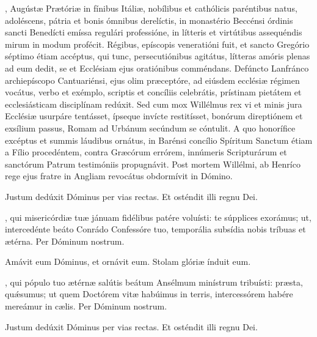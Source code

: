 \documentclass[fontsize=9pt,paper=A6,twoside,BCOR=1mm,DIV=22,headinclude]{scrarticle}
\begin{document}
\begin{multicols}{2}
{\columnbreak
{}
, Augústæ Prætóriæ in fínibus Itáliæ, nobílibus et cathólicis paréntibus natus, adoléscens, pátria et bonis ómnibus derelíctis, in monastério Beccénsi órdinis sancti Benedícti emíssa regulári professióne, in lítteris et virtútibus assequéndis mirum in modum profécit. Régibus, epíscopis veneratióni fuit, et sancto Gregório séptimo étiam accéptus, qui tunc, persecutiónibus agitátus, lítteras amóris plenas ad eum dedit, se et Ecclésiam ejus oratiónibus comméndans. Defúncto Lanfránco archiepíscopo Cantuariénsi, ejus olim præceptóre, ad eiúsdem ecclésiæ régimen vocátus, verbo et exémplo, scriptis et concíliis celebrátis, prístinam pietátem et ecclesiásticam disciplínam redúxit. Sed cum mox Willélmus rex vi et minis jura Ecclésiæ usurpáre tentásset, ípseque invícte restitísset, bonórum direptiónem et exsílium passus, Romam ad Urbánum secúndum se cóntulit. A quo honorífice excéptus et summis láudibus ornátus, in Barénsi concílio Spíritum Sanctum étiam a Fílio procedéntem, contra Græcórum errórem, innúmeris Scripturárum et sanctórum Patrum testimóniis propugnávit. Post mortem Willélmi, ab Henríco rege ejus fratre in Angliam revocátus obdormívit in Dómino.

\Te


\V Justum dedúxit Dóminus per vias rectas. \TPA 
\R Et osténdit illi regnu Dei. \TPA 

\BC \TPA

, qui misericórdiæ tuæ jánuam fidélibus patére voluísti: te súpplices exorámus; ut, intercedénte beáto Conrádo Confessóre tuo, temporália subsídia nobis tríbuas et ætérna. Per Dóminum nostrum.


\AiiCP \TPA

\V Amávit eum Dóminus, et ornávit eum. \TPA
\R Stolam glóriæ índuit eum. \TPA 

, qui pópulo tuo ætérnæ salútis beátum Ansélmum minístrum tribuísti: præsta, quǽsumus; ut quem Doctórem vitæ habúimus in terris, intercessórem habére mereámur in cælis. Per Dóminum nostrum.

}


\V Justum dedúxit Dóminus per vias rectas. \TPA 
\R Et osténdit illi regnu Dei. \TPA 

\MiiC \TPA


\end{multicols}
\end{document}
